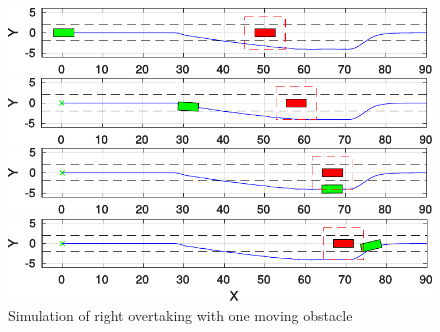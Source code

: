 \documentclass[conference, 11pt]{IEEEtran}
\begin{document}
\begin{figure}[H]
	\centering
	\begin{minipage}[t]{\columnwidth}
	\includegraphics[width=1\columnwidth]{../../MATLAB/one_obstacle_right_overtaking/figure/overtaking_paper/overtaking_start.pdf}
	\end{minipage}
	\begin{minipage}[t]{\columnwidth}
	\includegraphics[width=1\columnwidth]{../../MATLAB/one_obstacle_right_overtaking/figure/overtaking_paper/overtaking_middle.pdf}
	\end{minipage}
	\begin{minipage}[t]{\columnwidth}
	\includegraphics[width=1\columnwidth]{../../MATLAB/one_obstacle_right_overtaking/figure/overtaking_paper/overtaking_middle_end.pdf}
	\end{minipage}
	\begin{minipage}[t]{\columnwidth}
	\includegraphics[width=1\columnwidth]{../../MATLAB/one_obstacle_right_overtaking/figure/overtaking_paper/overtaking_end.pdf}
	\end{minipage}
	\vspace{-20pt}
	\caption{Simulation of right overtaking with one moving obstacle}
	\label{fig:obstacleAvoidance_one_obstacle}
\end{figure}
\end{document}
